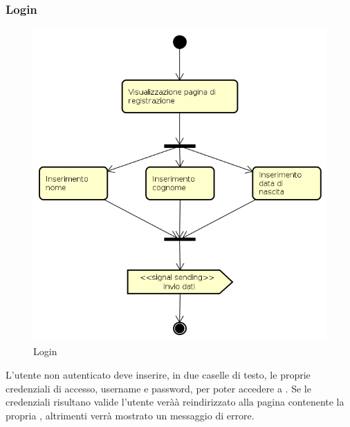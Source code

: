 \subsubsection{Login}
\begin{figure}[H]
\begin{center}
\includegraphics[height=12cm]{res/sections/backend/activities/registrazione.png}
\caption{Login}
\end{center}
\end{figure}
L'utente non autenticato deve inserire, in due caselle di testo, le proprie credenziali di accesso, username e password, per poter accedere a . Se le credenziali risultano valide l'utente veràà reindirizzato alla pagina contenente la propria , altrimenti verrà mostrato un messaggio di errore.
